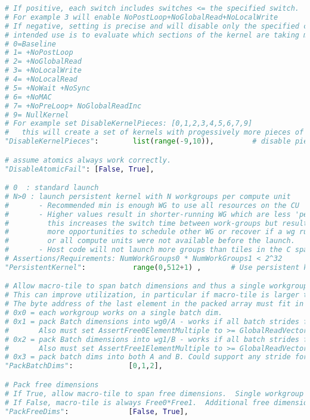 \documentclass[]{article}
\begin{document}
\begin{lstlisting}[language=python,breaklines=true]
# If positive, each switch includes switches <= the specified switch.
# For example 3 will enable NoPostLoop+NoGlobalRead+NoLocalWrite
# If negative, setting is precise and will disable only the specified code piece.
# intended use is to evaluate which sections of the kernel are taking most of the execution time
# 0=Baseline
# 1= +NoPostLoop
# 2= +NoGlobalRead
# 3= +NoLocalWrite
# 4= +NoLocalRead
# 5= +NoWait +NoSync
# 6= +NoMAC
# 7= +NoPreLoop+ NoGlobalReadInc
# 9= NullKernel
# For example set DisableKernelPieces: [0,1,2,3,4,5,6,7,9]
#   this will create a set of kernels with progessively more pieces of the kernel disabled
"DisableKernelPieces":        list(range(-9,10)),         # disable pieces of the kernel, for performance isolation

# assume atomics always work correctly.
"DisableAtomicFail": [False, True],

# 0  : standard launch
# N>0 : launch persistent kernel with N workgroups per compute unit
#       - Recommended min is enough WG to use all resources on the CU
#       - Higher values result in shorter-running WG which are less 'persistent'
#         this increases the switch time between work-groups but results in
#         more opportunities to schedule other WG or recover if a wg runs long
#         or all compute units were not available before the launch.
#       - Host code will not launch more groups than tiles in the C space
# Assertions/Requirements: NumWorkGroups0 * NumWorkGroups1 < 2^32
"PersistentKernel":           range(0,512+1) ,       # Use persistent kernel.

# Allow macro-tile to span batch dimensions and thus a single workgroup can work across batch dimensions.
# This can improve utilization, in particular if macro-tile is larger than the lower dimensions.
# The byte address of the last element in the packed array must fit in 2^32.
# 0x0 = each workgroup works on a single batch dim.
# 0x1 = pack Batch dimensions into wg0/A - works if all batch strides for B==0.
#       Also must set AssertFree0ElementMultiple to >= GlobalReadVectorWidth
# 0x2 = pack Batch dimensions into wg1/B - works if all batch strides for A==0
#       Also must set AssertFree1ElementMultiple to >= GlobalReadVectorWidth
# 0x3 = pack batch dims into both A and B. Could support any stride for A and B. (Not supported yet)
"PackBatchDims":             [0,1,2],

# Pack free dimensions
# If True, allow macro-tile to span free dimensions.  Single workgroup can work across multiple free dimensions.
# If False, macro-tile is always Free0*Free1.  Additional free dimensions are not supported.
"PackFreeDims":              [False, True],


\end{lstlisting}
\end{document}
